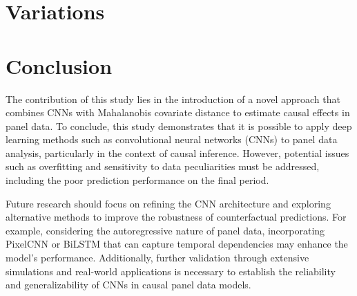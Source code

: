 \documentclass[12pt]{article}
\begin{document}
\section{Variations}


\section{Conclusion}

The contribution of this study lies in the introduction of a novel approach that combines CNNs with Mahalanobis covariate distance to estimate causal effects in panel data.
To conclude, this study demonstrates that it is possible to apply deep learning methods such as convolutional neural networks (CNNs) to panel data analysis, 
particularly in the context of causal inference.
However, potential issues such as overfitting and sensitivity to data peculiarities must be addressed, including
the poor prediction performance on the final period.

Future research should focus on refining the CNN architecture and exploring alternative methods to improve the robustness of counterfactual predictions.
For example, considering the autoregressive nature of panel data, incorporating PixelCNN or BiLSTM that 
can capture temporal dependencies may enhance the model's performance.
Additionally, further validation through extensive simulations and real-world applications is necessary to establish the reliability and generalizability of CNNs in causal panel data models.

\newpage
\printbibliography
\end{document}
